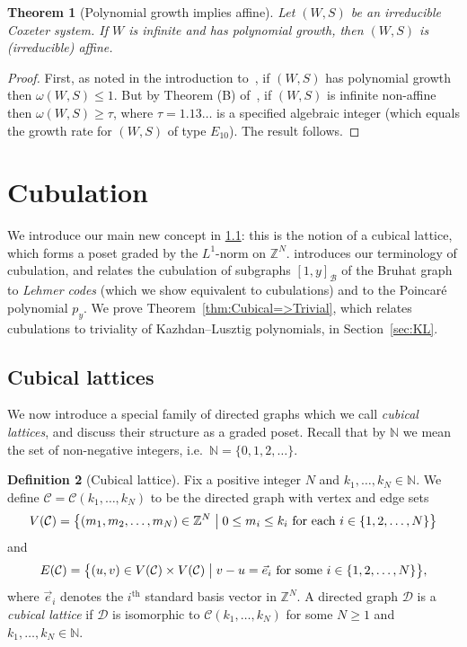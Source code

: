 \documentclass[11pt]{amsart}
\theoremstyle{plain}
\newtheorem{thm}{Theorem}[section]
\theoremstyle{definition}
\newtheorem{definition}[thm]{Definition}
\newcommand{\cC}{\mathcal{C}}
\newcommand{\cD}{\mathcal{D}}
\newcommand{\Z}{\mathbb{Z}}
\newcommand{\N}{\mathbb{N}}
\newcommand{\cB}{\mathcal B}
\numberwithin{equation}{subsection}
\begin{document}
\begin{thm}[Polynomial growth implies affine]\label{thm:polyAffine} Let $(W,S)$ be an irreducible Coxeter system. If $W$ is infinite and has polynomial growth, then $(W,S)$ is (irreducible) affine.
\end{thm}

\begin{proof} 
First, as noted in the introduction to~\cite{Terragni}, if $(W,S)$ has polynomial growth then $\omega(W,S) \leq 1$. But by Theorem (B) of~\cite{Terragni}, if $(W,S)$ is infinite non-affine then $\omega(W,S) \geq \tau$, where $\tau = 1.13\dots$ is a specified algebraic integer (which equals the growth rate for $(W,S)$ of type $E_{10}$). The result follows.
\end{proof}







\section{Cubulation}\label{sec:graphs}

We introduce our main new concept in \cref{sec:cubical}: this is the notion of a cubical lattice, which forms a poset graded by the $L^1$-norm on $\Z^N$.
 introduces our
terminology of cubulation, and relates the cubulation of subgraphs $[1,y]_\cB$ of the Bruhat graph to
\textit{Lehmer codes} (which we show equivalent to cubulations) and to the Poincar\'e polynomial $p_y$. We prove Theorem~\ref{thm:Cubical=>Trivial},
which relates cubulations to triviality of Kazhdan--Lusztig polynomials, in Section~\ref{sec:KL}.





\subsection{Cubical lattices}\label{sec:cubical}

We now introduce a special family of directed graphs which we call \emph{cubical lattices}, and discuss their structure as a graded poset. Recall that by $\N$ we mean the set of non-negative integers, i.e.~$\N = \{0,1,2,\ldots\}$.

\begin{definition}[Cubical lattice]\label{defn:cubical}
	Fix a positive integer $N$ and $k_1, \dots, k_N \in \N$. We define $\cC = \cC(k_1,\dots,k_N)$ to be the directed graph with vertex and edge sets
	\[ V(\cC) =	\bigl\{ (m_1,m_2,\ldots,m_N) \in \Z^N \bigm|	0 \leq m_i \leq k_i \text{ for each }i \in \{1,2,\ldots,N\} \bigr\} \]
  and
  \[ E(\cC)  = \bigl\{ (u,v) \in V(\cC) \times V(\cC) \bigm| v-u  = \vec{e}_i \ \text{for some}\ i \in \{1,2,\ldots,N\} \bigr\}, \]
where $\vec{e}_i$ denotes the $i^{\text{th}}$ standard basis vector in $\Z^N$. A directed graph $\cD$ is a \emph{cubical lattice} if $\cD$ is isomorphic to $\cC(k_1, \dots, k_N)$ for some $N \geq 1$ and $k_1,\dots,k_N \in \N$.
\end{definition}
\end{document}
